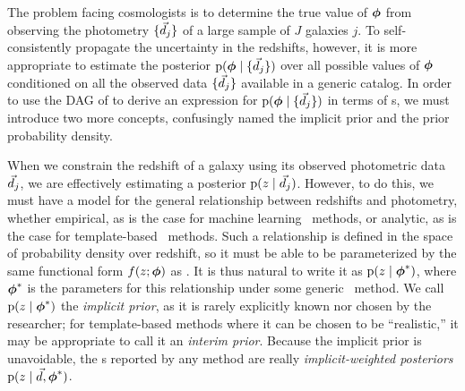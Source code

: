 The problem facing cosmologists is to determine the true value of ${\boldsymbol{\phi}}$ from observing the photometry $\{\vec{d}_{j}\}$ of a large sample of $J$ galaxies $j$.
To self-consistently propagate the uncertainty in the redshifts, however, it is more appropriate to estimate the posterior $\mathrm{p}({\boldsymbol{\phi}} \mid \{\vec{d}_{j}\})$ over all possible values of ${\boldsymbol{\phi}}$ conditioned on all the observed data $\{\vec{d}_{j}\}$ available in a generic catalog.
In order to use the DAG of  to derive an expression for $\mathrm{p}({\boldsymbol{\phi}} \mid \{\vec{d}_{j}\})$ in terms of \pzpdf s, we must introduce two more concepts, confusingly named the implicit prior and the prior probability density.

When we constrain the redshift of a galaxy using its observed photometric data $\vec{d}_{j}$, we are effectively estimating a posterior $\mathrm{p}(z \mid \vec{d}_{j})$.
However, to do this, we must have a model for the general relationship between redshifts and photometry, whether empirical, as is the case for machine learning \pzpdf\ methods, or analytic, as is the case for template-based \pzpdf\ methods.
Such a relationship is defined in the space of probability density over redshift, so it must be able to be parameterized by the same functional form $f(z; {\boldsymbol{\phi}})$ as \nz .
It is thus natural to write it as $\mathrm{p}(z \mid {\ensuremath{\boldsymbol{\phi}}}^{*})$, where ${\boldsymbol{\phi}}^{*}$ is the parameters for this relationship under some generic \pzpdf\ method.
We call $\mathrm{p}(z \mid {\ensuremath{\boldsymbol{\phi}}}^{*})$ the \textit{implicit prior}, as it is rarely explicitly known nor chosen by the researcher; for template-based methods where it can be chosen to be ``realistic,'' it may be appropriate to call it an \textit{interim prior}.
Because the implicit prior is unavoidable, the \pzpdf s reported by any method are really \textit{implicit-weighted posteriors} $\mathrm{p}(z \mid \vec{d}, {\boldsymbol{\phi}}^{*})$.


